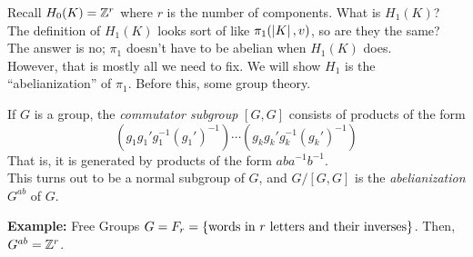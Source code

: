 Recall $H_0(K) = \Z^r$ where $r$ is the number of components. What is $H_1(K)$?\\

The definition of $H_1(K)$ looks sort of like $\pi_1(\abs{K}, v)$, so are they the same? The answer is no; $\pi_1$ doesn't have to be abelian when $H_1(K)$ does.\\

However, that is mostly all we need to fix. We will show $H_1$ is the ``abelianization'' of $\pi_1$. Before this, some group theory.

\begin{definition}
    If $G$ is a group, the \emph{commutator subgroup} $[G, G]$ consists of products of the form
    \[ (g_1g_1'g_1^{-1}(g_1')^{-1}) \cdots (g_kg_k'g_k^{-1}(g_k')^{-1}) \]
    That is, it is generated by products of the form $aba^{-1}b^{-1}$.\\

    This turns out to be a normal subgroup of $G$, and $G/[G, G]$ is the \emph{abelianization} $G^{ab}$ of $G$.
\end{definition}

\begin{example}{\textbf{Example:} Free Groups}
    $G = F_r = \{\tt{words in } r \tt{ letters and their inverses}\}$. Then, $G^{ab} = \Z^r$.
\end{example}
